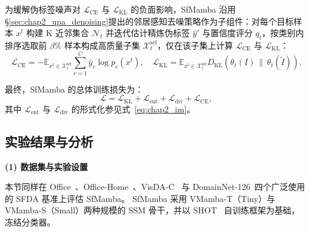 为缓解伪标签噪声对 $\mathcal{L}_{\text{CE}}$ 与 $\mathcal{L}_{\text{KL}}$ 的负面影响，SfMamba 沿用§\ref{sec:chap2_upa_denoising}提出的邻居感知去噪策略作为子组件：对每个目标样本 $x^t$ 构建 K 近邻集合 $\mathcal{N}_t$ 并迭代估计精炼伪标签 $\hat{y}'$ 与置信度评分 $q_t$，按类别内排序选取前 $\beta\%$ 样本构成高质量子集 $\mathcal{X}_t^{\text{sel}}$，仅在该子集上计算 $\mathcal{L}_{\text{CE}}$ 与 $\mathcal{L}_{\text{KL}}$：
\begin{equation}
\mathcal{L}_{\text{CE}} = -\mathbb{E}_{x^t \in \mathcal{X}_t^{\text{sel}}} \sum_{c=1}^{C} \hat{y}_c \log p_c(x^t), \quad
\mathcal{L}_{\text{KL}} = \mathbb{E}_{x^t \in \mathcal{X}_t^{\text{sel}}} D_{\text{KL}}\!\left(\theta_t(I) \,\|\, \theta_t(\tilde{I})\right).
\label{eq:scs_loss_ch}
\end{equation}

最终，SfMamba 的总体训练损失为：
\begin{equation}
\mathcal{L} = \mathcal{L}_{\text{KL}} + \mathcal{L}_{\text{ent}} + \mathcal{L}_{\text{div}} + \mathcal{L}_{\text{CE}},
\label{eq:scs_total_loss}
\end{equation}
其中 $\mathcal{L}_{\text{ent}}$ 与 $\mathcal{L}_{\text{div}}$ 的形式化参见式~\eqref{eq:chap2_im}。


\subsection{实验结果与分析}

\noindent\textbf{(1) 数据集与实验设置}

本节同样在 Office~\cite{saenko2010adapting}、Office-Home~\cite{venkateswara2017deep}、VisDA-C~\cite{peng2017visda} 与 DomainNet-126~\cite{saito2019semi}四个广泛使用的 SFDA 基准上评估 SfMamba。
SfMamba 采用 VMamba-T（Tiny）与 VMamba-S（Small）两种规模的 SSM 骨干，并以 SHOT~\cite{liang2021source} 自训练框架为基础，冻结分类器。

